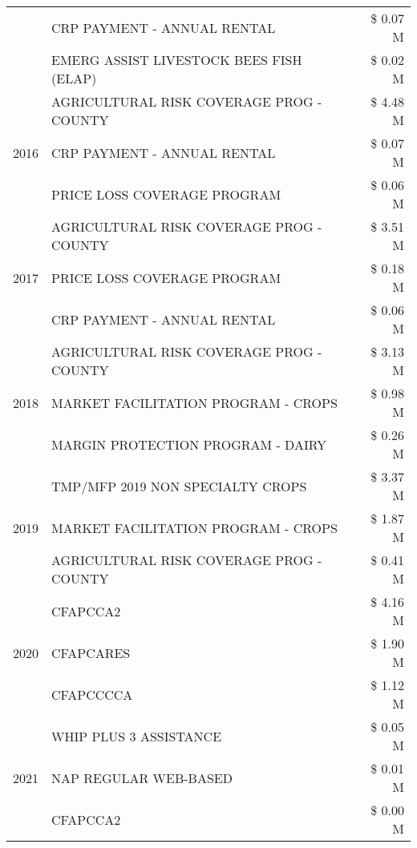 \begin{tabular}{llr}
 & CRP PAYMENT - ANNUAL RENTAL & \$ 0.07 M \\
 & EMERG ASSIST LIVESTOCK BEES FISH (ELAP) & \$ 0.02 M \\
\cline{1-3}
\multirow[t]{3}{*}{2016} & AGRICULTURAL RISK COVERAGE PROG - COUNTY & \$ 4.48 M \\
 & CRP PAYMENT - ANNUAL RENTAL & \$ 0.07 M \\
 & PRICE LOSS COVERAGE PROGRAM & \$ 0.06 M \\
\cline{1-3}
\multirow[t]{3}{*}{2017} & AGRICULTURAL RISK COVERAGE PROG - COUNTY & \$ 3.51 M \\
 & PRICE LOSS COVERAGE PROGRAM & \$ 0.18 M \\
 & CRP PAYMENT - ANNUAL RENTAL & \$ 0.06 M \\
\cline{1-3}
\multirow[t]{3}{*}{2018} & AGRICULTURAL RISK COVERAGE PROG - COUNTY & \$ 3.13 M \\
 & MARKET FACILITATION PROGRAM - CROPS & \$ 0.98 M \\
 & MARGIN PROTECTION PROGRAM - DAIRY & \$ 0.26 M \\
\cline{1-3}
\multirow[t]{3}{*}{2019} & TMP/MFP 2019 NON SPECIALTY CROPS & \$ 3.37 M \\
 & MARKET FACILITATION PROGRAM - CROPS & \$ 1.87 M \\
 & AGRICULTURAL RISK COVERAGE PROG - COUNTY & \$ 0.41 M \\
\cline{1-3}
\multirow[t]{3}{*}{2020} & CFAPCCA2 & \$ 4.16 M \\
 & CFAPCARES & \$ 1.90 M \\
 & CFAPCCCCA & \$ 1.12 M \\
\cline{1-3}
\multirow[t]{3}{*}{2021} & WHIP PLUS 3 ASSISTANCE & \$ 0.05 M \\
 & NAP REGULAR WEB-BASED & \$ 0.01 M \\
 & CFAPCCA2 & \$ 0.00 M \\
\cline{1-3}
\bottomrule
\end{tabular}
